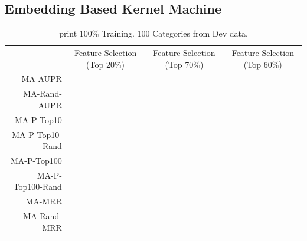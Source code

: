 \documentclass{article}
\renewcommand{\bullet}[0]{$\blacktriangleright$}
\begin{document}
\subsection{Embedding Based Kernel Machine}
\label{ssec:results-embedding-based-km}
\begin{table}[htbp]
  \centering
{}
  \begin{tabular}{r  c  c c }\toprule
                 & Feature Selection (Top 20\%) & Feature Selection (Top 70\%) & Feature Selection (Top 60\%) \\
MA-AUPR          &                         \\
MA-Rand-AUPR     &                         \\
MA-P-Top10       &                         \\
MA-P-Top10-Rand  &                         \\
MA-P-Top100      &                         \\
MA-P-Top100-Rand &                         \\
MA-MRR           &                         \\
MA-Rand-MRR      &                         \\
\bottomrule\end{tabular}
  \caption{print 100\% Training. 100 Categories from Dev data.}
  \label{tab:summary-embedding-based-km}
\end{table}

\end{document}
